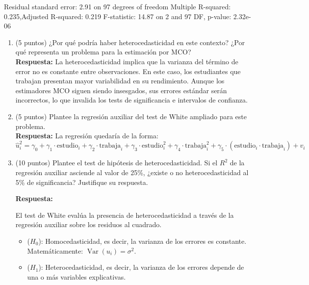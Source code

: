 \documentclass[10pt,a4paper]{article}
\begin{document}
\begin{enumerate}
{\begin{minipage}{0.95\textwidth}
Residual standard error: 2.91 on 97 degrees of freedom\newline
Multiple R-squared: 0.235,\quad Adjusted R-squared: 0.219\newline
F-statistic: 14.87 on 2 and 97 DF, \quad p-value: 2.32e-06
\end{minipage}
}


\begin{enumerate}
    \item (5 puntos) ¿Por qué podría haber heterocedasticidad en este contexto? ¿Por qué representa un problema para la estimación por MCO?\\
{\color{blue}
    \textbf{Respuesta:} La heterocedasticidad implica que la varianza del término de error no es constante entre observaciones. En este caso, los estudiantes que trabajan presentan mayor variabilidad en su rendimiento. Aunque los estimadores MCO siguen siendo insesgados, sus errores estándar serán incorrectos, lo que invalida los tests de significancia e intervalos de confianza.}\\

    \item (5 puntos) Plantee la regresión auxiliar del test de White ampliado para este problema.\\

{\color{blue}
    \textbf{Respuesta:} La regresión quedaría de la forma:
$$\hat{u}_i^2 = \gamma_0 
+ \gamma_1 \cdot \text{estudio}_i 
+ \gamma_2 \cdot \text{trabaja}_i 
+ \gamma_3 \cdot \text{estudio}_i^2 
+ \gamma_4 \cdot \text{trabaja}_i^2 
+ \gamma_5 \cdot (\text{estudio}_i \cdot \text{trabaja}_i) 
+ v_i$$}

    \item (10 puntos) Plantee el test de hipótesis de heterocedasticidad. Si el $R^2$ de la regresión auxiliar asciende al valor de 25\%, ¿existe o no heterocedasticidad al 5\% de significancia? Justifique su respuesta.\\


{\color{blue}
\textbf{Respuesta:}

El test de White evalúa la presencia de heterocedasticidad a través de la regresión auxiliar sobre los residuos al cuadrado.

\begin{itemize}
    \item (\(H_0\)): Homocedasticidad, es decir, la varianza de los errores es constante. Matemáticamente: \(\operatorname{Var}(u_i) = \sigma^2\).
    \item (\(H_1\)): Heterocedasticidad, es decir, la varianza de los errores depende de una o más variables explicativas.
\end{itemize}

}
\end{enumerate}
\end{enumerate}
\end{document}
